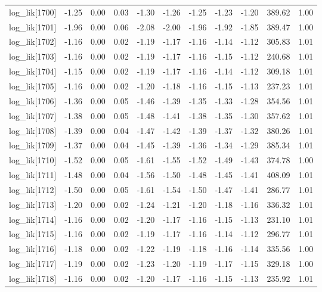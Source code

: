 \begin{table}[ht]
\begin{tabular}{rrrrrrrrrrr}
  log\_lik[1700] & -1.25 & 0.00 & 0.03 & -1.30 & -1.26 & -1.25 & -1.23 & -1.20 & 389.62 & 1.00 \\ 
  log\_lik[1701] & -1.96 & 0.00 & 0.06 & -2.08 & -2.00 & -1.96 & -1.92 & -1.85 & 389.47 & 1.00 \\ 
  log\_lik[1702] & -1.16 & 0.00 & 0.02 & -1.19 & -1.17 & -1.16 & -1.14 & -1.12 & 305.83 & 1.01 \\ 
  log\_lik[1703] & -1.16 & 0.00 & 0.02 & -1.19 & -1.17 & -1.16 & -1.15 & -1.12 & 240.68 & 1.01 \\ 
  log\_lik[1704] & -1.15 & 0.00 & 0.02 & -1.19 & -1.17 & -1.16 & -1.14 & -1.12 & 309.18 & 1.01 \\ 
  log\_lik[1705] & -1.16 & 0.00 & 0.02 & -1.20 & -1.18 & -1.16 & -1.15 & -1.13 & 237.23 & 1.01 \\ 
  log\_lik[1706] & -1.36 & 0.00 & 0.05 & -1.46 & -1.39 & -1.35 & -1.33 & -1.28 & 354.56 & 1.01 \\ 
  log\_lik[1707] & -1.38 & 0.00 & 0.05 & -1.48 & -1.41 & -1.38 & -1.35 & -1.30 & 357.62 & 1.01 \\ 
  log\_lik[1708] & -1.39 & 0.00 & 0.04 & -1.47 & -1.42 & -1.39 & -1.37 & -1.32 & 380.26 & 1.01 \\ 
  log\_lik[1709] & -1.37 & 0.00 & 0.04 & -1.45 & -1.39 & -1.36 & -1.34 & -1.29 & 385.34 & 1.01 \\ 
  log\_lik[1710] & -1.52 & 0.00 & 0.05 & -1.61 & -1.55 & -1.52 & -1.49 & -1.43 & 374.78 & 1.00 \\ 
  log\_lik[1711] & -1.48 & 0.00 & 0.04 & -1.56 & -1.50 & -1.48 & -1.45 & -1.41 & 408.09 & 1.01 \\ 
  log\_lik[1712] & -1.50 & 0.00 & 0.05 & -1.61 & -1.54 & -1.50 & -1.47 & -1.41 & 286.77 & 1.01 \\ 
  log\_lik[1713] & -1.20 & 0.00 & 0.02 & -1.24 & -1.21 & -1.20 & -1.18 & -1.16 & 336.32 & 1.01 \\ 
  log\_lik[1714] & -1.16 & 0.00 & 0.02 & -1.20 & -1.17 & -1.16 & -1.15 & -1.13 & 231.10 & 1.01 \\ 
  log\_lik[1715] & -1.16 & 0.00 & 0.02 & -1.19 & -1.17 & -1.16 & -1.14 & -1.12 & 296.77 & 1.01 \\ 
  log\_lik[1716] & -1.18 & 0.00 & 0.02 & -1.22 & -1.19 & -1.18 & -1.16 & -1.14 & 335.56 & 1.00 \\ 
  log\_lik[1717] & -1.19 & 0.00 & 0.02 & -1.23 & -1.20 & -1.19 & -1.17 & -1.15 & 329.18 & 1.00 \\ 
  log\_lik[1718] & -1.16 & 0.00 & 0.02 & -1.20 & -1.17 & -1.16 & -1.15 & -1.13 & 235.92 & 1.01 \\ 

\end{tabular}
\end{table}

